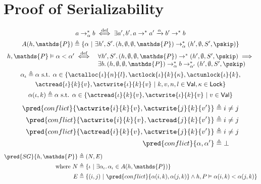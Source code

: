 \section{Proof of Serializability}

\begin{gather*}
a \rightarrow^*_\alpha b \overset{\text{def}}{\iff} \exists a', b' \ldotp a \rightarrow^* a' \xrightarrow{\alpha} b' \rightarrow^* b
\\
A(h, \mathds{P}) \triangleq \{ \alpha\ |\ \exists h', S' \ldotp (h, \emptyset, \emptyset, \mathds{P}) \rightarrow_\alpha^* (h', \emptyset, S', \pskip) \}
\\
\begin{array}{l l}
h, \mathds{P} \vDash \alpha < \alpha' \overset{\text{def}}{\iff}
&
\forall h', S' \ldotp (h, \emptyset, \emptyset, \mathds{P}) \rightarrow^* (h', \emptyset, S', \pskip) \implies
\\
& \exists b \ldotp (h, \emptyset, \emptyset, \mathds{P}) \rightarrow_\alpha^* b \rightarrow^*_{\alpha'} (h', \emptyset, S', \pskip)
\end{array}
\\
\alpha_\iota \triangleq \alpha \text{ s.t. } \alpha \in \{ \actalloc{\iota}{n}{l}, \actlock{\iota}{k}{\kappa}, \actunlock{\iota}{k}, \\ \actread{\iota}{k}{v}, \actwrite{\iota}{k}{v}\ |\ k, v, n, l \in \mathsf{Val}, \kappa \in \mathsf{Lock} \}
\\
\alpha(\iota, k) \triangleq \alpha \text{ s.t. } \alpha \in \{ \actread{\iota}{k}{v}, \actwrite{\iota}{k}{v}\ |\ v \in \mathsf{Val} \}
\end{gather*}
\begin{align*}
\pred{conflict}{\actwrite{i}{k}{v}, \actwrite{j}{k}{v'}} &\triangleq i \neq j
\\
\pred{conflict}{\actwrite{i}{k}{v}, \actread{j}{k}{v'}} &\triangleq i \neq j
\\
\pred{conflict}{\actread{i}{k}{v}, \actwrite{j}{k}{v'}} &\triangleq i \neq j
\\
\pred{conflict}{\alpha, \alpha'} &\triangleq \bot 
\end{align*}
\begin{align*}
\pred{SG}{h, \mathds{P}} &\triangleq (N, E) \\
\text{where } N &\triangleq \{ \iota\ |\ \exists \alpha_\iota \ldotp \alpha_\iota \in A(h, \mathds{P}) \} \\
E &\triangleq \{ (i, j)\ |\ \pred{conflict}{\alpha(i, k), \alpha(j, k)} \land h, P \vDash \alpha(i, k) < \alpha(j, k) \}
\end{align*}

